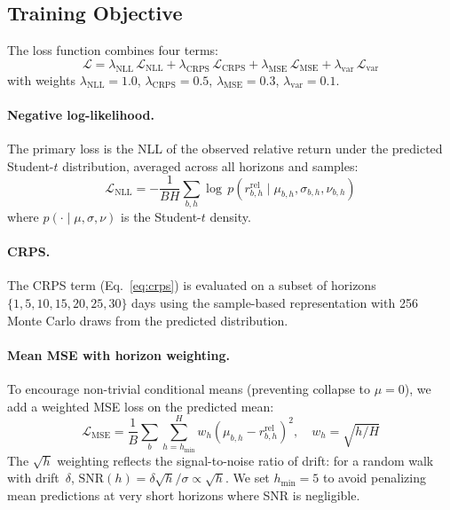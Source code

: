 \documentclass[sigconf]{acmart}
\begin{document}
\subsection{Training Objective}

The loss function combines four terms:
\begin{equation}
\mathcal{L} = \lambda_{\text{NLL}}\,\mathcal{L}_{\text{NLL}} + \lambda_{\text{CRPS}}\,\mathcal{L}_{\text{CRPS}} + \lambda_{\text{MSE}}\,\mathcal{L}_{\text{MSE}} + \lambda_{\text{var}}\,\mathcal{L}_{\text{var}}
\label{eq:loss}
\end{equation}
with weights $\lambda_{\text{NLL}} = 1.0$, $\lambda_{\text{CRPS}} = 0.5$, $\lambda_{\text{MSE}} = 0.3$, $\lambda_{\text{var}} = 0.1$.

\paragraph{Negative log-likelihood.}
The primary loss is the NLL of the observed relative return under the predicted Student-$t$ distribution, averaged across all horizons and samples:
\begin{equation}
\mathcal{L}_{\text{NLL}} = -\frac{1}{BH}\sum_{b,h} \log\, p\!\left(r^{\text{rel}}_{b,h} \mid \mu_{b,h}, \sigma_{b,h}, \nu_{b,h}\right)
\end{equation}
where $p(\cdot \mid \mu, \sigma, \nu)$ is the Student-$t$ density.

\paragraph{CRPS.}
The CRPS term (Eq.~\ref{eq:crps}) is evaluated on a subset of horizons $\{1, 5, 10, 15, 20, 25, 30\}$ days using the sample-based representation with 256 Monte Carlo draws from the predicted distribution.

\paragraph{Mean MSE with horizon weighting.}
To encourage non-trivial conditional means (preventing collapse to $\mu = 0$), we add a weighted MSE loss on the predicted mean:
\begin{equation}
\mathcal{L}_{\text{MSE}} = \frac{1}{B}\sum_b \sum_{h=h_{\min}}^{H} w_h \left(\mu_{b,h} - r^{\text{rel}}_{b,h}\right)^2, \quad w_h = \sqrt{h/H}
\label{eq:mse}
\end{equation}
The $\sqrt{h}$ weighting reflects the signal-to-noise ratio of drift: for a random walk with drift~$\delta$, $\text{SNR}(h) = \delta\sqrt{h}/\sigma \propto \sqrt{h}$.
We set $h_{\min} = 5$ to avoid penalizing mean predictions at very short horizons where SNR is negligible.
\end{document}
